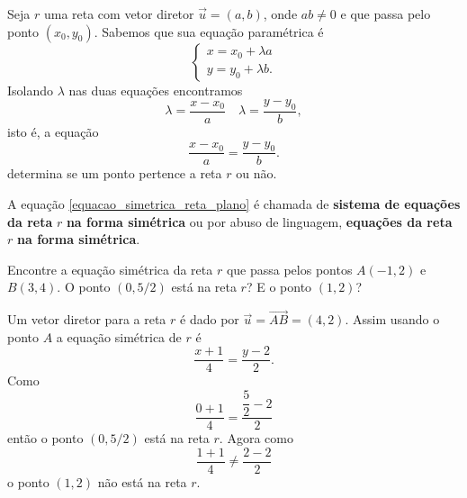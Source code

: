 Seja $r$ uma reta com vetor diretor $\vec{u} = (a,b)$, onde $ab\ne 0$ e que passa pelo ponto $(x_0, y_0)$. Sabemos que sua equação paramétrica é
\[
  \begin{cases}
    x = x_0 + \lambda a\\
    y = y_0 + \lambda b.
  \end{cases}
\]
Isolando $\lambda$ nas duas equações encontramos
\[
  \lambda = \dfrac{x - x_0}{a}\quad \lambda = \dfrac{y - y_0}{b},
\]
isto é, a equação
\begin{equation}\label{equacao_simetrica_reta_plano}
  \dfrac{x - x_0}{a} = \dfrac{y - y_0}{b}.
\end{equation}
determina se um ponto pertence a reta $r$ ou não.

\begin{definicao}
  A equação \eqref{equacao_simetrica_reta_plano} é chamada de \textbf{sistema de equações da reta} $r$ \textbf{na forma simétrica} ou por abuso de linguagem, \textbf{equações da reta} $r$ \textbf{na forma simétrica}.
\end{definicao}

\begin{exemplos}
 Encontre a equação simétrica da reta $r$ que passa pelos pontos $A(-1,2)$ e $B(3,4)$. O ponto $(0,5/2)$ está na reta $r$? E o ponto $(1,2)$?
 \begin{solucao}
   Um vetor diretor para a reta $r$ é dado por $\vec{u} = \vec{AB} = (4,2)$. Assim usando o ponto $A$ a equação simétrica de $r$ é
   \[
     \dfrac{x + 1}{4} = \dfrac{y - 2}{2}.
   \]
 Como
 \[
    \dfrac{0 + 1}{4} = \dfrac{\dfrac{5}{2} - 2}{2}
 \]
 então o ponto $(0,5/2)$ está na reta $r$. Agora como
 \[
  \dfrac{1+1}{4} \ne \dfrac{2 - 2}{2}
 \]
 o ponto $(1, 2)$ não está na reta $r$.

 \end{solucao}
\end{exemplos}


